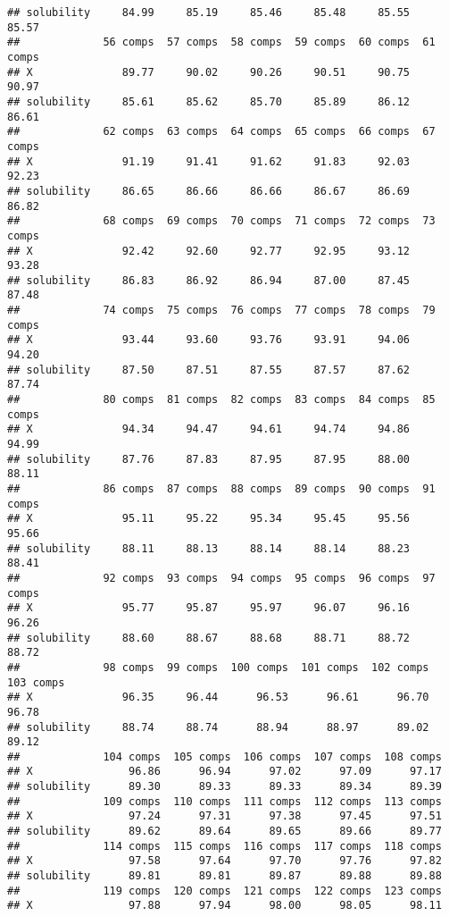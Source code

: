 \documentclass[]{article}
\begin{document}
\begin{verbatim}
## solubility     84.99     85.19     85.46     85.48     85.55     85.57
##             56 comps  57 comps  58 comps  59 comps  60 comps  61 comps
## X              89.77     90.02     90.26     90.51     90.75     90.97
## solubility     85.61     85.62     85.70     85.89     86.12     86.61
##             62 comps  63 comps  64 comps  65 comps  66 comps  67 comps
## X              91.19     91.41     91.62     91.83     92.03     92.23
## solubility     86.65     86.66     86.66     86.67     86.69     86.82
##             68 comps  69 comps  70 comps  71 comps  72 comps  73 comps
## X              92.42     92.60     92.77     92.95     93.12     93.28
## solubility     86.83     86.92     86.94     87.00     87.45     87.48
##             74 comps  75 comps  76 comps  77 comps  78 comps  79 comps
## X              93.44     93.60     93.76     93.91     94.06     94.20
## solubility     87.50     87.51     87.55     87.57     87.62     87.74
##             80 comps  81 comps  82 comps  83 comps  84 comps  85 comps
## X              94.34     94.47     94.61     94.74     94.86     94.99
## solubility     87.76     87.83     87.95     87.95     88.00     88.11
##             86 comps  87 comps  88 comps  89 comps  90 comps  91 comps
## X              95.11     95.22     95.34     95.45     95.56     95.66
## solubility     88.11     88.13     88.14     88.14     88.23     88.41
##             92 comps  93 comps  94 comps  95 comps  96 comps  97 comps
## X              95.77     95.87     95.97     96.07     96.16     96.26
## solubility     88.60     88.67     88.68     88.71     88.72     88.72
##             98 comps  99 comps  100 comps  101 comps  102 comps  103 comps
## X              96.35     96.44      96.53      96.61      96.70      96.78
## solubility     88.74     88.74      88.94      88.97      89.02      89.12
##             104 comps  105 comps  106 comps  107 comps  108 comps
## X               96.86      96.94      97.02      97.09      97.17
## solubility      89.30      89.33      89.33      89.34      89.39
##             109 comps  110 comps  111 comps  112 comps  113 comps
## X               97.24      97.31      97.38      97.45      97.51
## solubility      89.62      89.64      89.65      89.66      89.77
##             114 comps  115 comps  116 comps  117 comps  118 comps
## X               97.58      97.64      97.70      97.76      97.82
## solubility      89.81      89.81      89.87      89.88      89.88
##             119 comps  120 comps  121 comps  122 comps  123 comps
## X               97.88      97.94      98.00      98.05      98.11

\end{verbatim}
\end{document}
